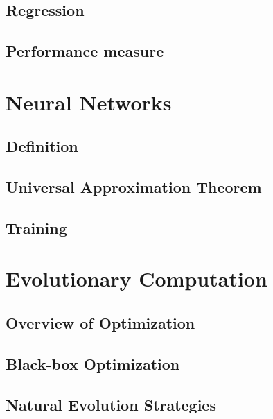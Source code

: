 \subsection{Regression}
\subsection{Performance measure}

\section{Neural Networks}
\subsection{Definition}
\subsection{Universal Approximation Theorem}
\subsection{Training}

\section{Evolutionary Computation}
\subsection{Overview of Optimization}
\subsection{Black-box Optimization}
\subsection{Natural Evolution Strategies}